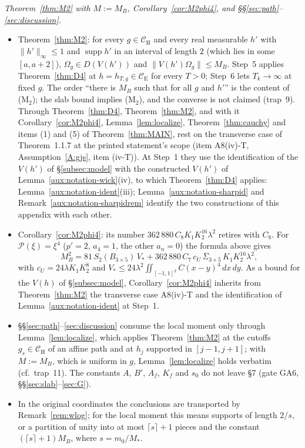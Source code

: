 \documentclass[11pt,a4paper]{article}
\theoremstyle{plain}
\theoremstyle{definition}
\theoremstyle{plain}
\theoremstyle{definition}
\newcommand{\CE}{\mathcal{C}_{\mathrm E}}
\newcommand{\CH}{\mathcal{C}_{\mathrm H}}
\newcommand{\Om}{\Omega}
\DeclareMathOperator{\supp}{supp}
\begin{document}
\emph{Theorem~\ref{thm:M2} with $M:=M_B$, Corollary~\ref{cor:M2phi4}, and \S\S\ref{sec:path}--\ref{sec:discussion}.}
\begin{itemize}
\item Theorem~\ref{thm:M2}: for every $g\in\CH$ and every real measurable $h'$ with
$\|h'\|_\infty\le1$ and $\supp h'$ in an interval of length $2$ (which lies in some
$[a,a+2]$), $\Om_g\in D(V(h'))$ and $\|V(h')\Om_g\|\le M_B$. Step~5 applies
Theorem~\ref{thm:D4} at $h=h_{T,g}\in\CE$ for every $T>0$; Step~6 lets $T_k\to\infty$ at fixed
$g$. The order ``there is $M_B$ such that for all $g$ and $h'$'' is the content of (M$_2$); the
slab bound implies (M$_2$), and the converse is not claimed (trap~9).  Through
Theorem~\ref{thm:D4}, Theorem~\ref{thm:M2}, and with it Corollary~\ref{cor:M2phi4}, Lemma~\ref{lem:localize}, Theorem~\ref{thm:cauchy} and
items (1) and (5) of Theorem~\ref{thm:MAIN}, rest on the transverse case of Theorem~1.1.7 at the printed
statement's scope (item A8(iv)-T, Assumption~\ref{A:gjs}, item (iv-T)).  At Step~1 they use the identification of the $V(h')$ of \S\ref{subsec:model} with the
constructed $V(h')$ of Lemma~\ref{aux:notation-wick}(iv), to which Theorem~\ref{thm:D4} applies:
Lemma~\ref{aux:notation-ident}(iii); Lemma~\ref{aux:notation-sharpid} and
Remark~\ref{aux:notation-sharpidrem} identify the two constructions of this appendix with each
other.
\item Corollary~\ref{cor:M2phi4}: its number $362\,880\,C_8K_1K_2^{16}\lambda^2$ retires
with $C_8$. For $\mathscr P(\xi)=\xi^4$ ($p'=2$, $a_4=1$, the other $a_n=0$) the formula above
gives
\[
 M_B^2=81\,S_2(B_{3\times5})\,V_*+362\,880\,C_7\,c_U\,\overline\Sigma_{3\times5}\,
 K_1K_2^{16}\lambda^2,
\]
with $c_U=24\lambda K_1K_2^8$ and $V_*\le24\lambda^2\iint_{[-1,1]^2}C(x-y)^4\,dx\,dy$.  As a
bound for the $V(h)$ of \S\ref{subsec:model}, Corollary~\ref{cor:M2phi4} inherits from
Theorem~\ref{thm:M2} the transverse case A8(iv)-T and the identification of
Lemma~\ref{aux:notation-ident} at Step~1.
\item \S\S\ref{sec:path}--\ref{sec:discussion} consume the local moment only through Lemma~\ref{lem:localize}, which applies
Theorem~\ref{thm:M2} at the cutoffs $g_s\in\CH$ of an affine path and at $h_j$ supported in
$[j-1,j+1]$; with $M:=M_B$, which is uniform in $g$, Lemma~\ref{lem:localize} holds verbatim (cf.\ trap~11).
The constants $A$, $B'$, $A_f$, $K_f$ and $s_0$ do not leave \S7 (gate GA6,
\S\S\ref{sec:slab}--\ref{sec:G}).
\item In the original coordinates the conclusions are transported by Remark~\ref{rem:wlog}; for the local moment this means supports of length $2/s$, or a partition of unity into
at most $\lceil s\rceil+1$ pieces and the constant $(\lceil s\rceil+1)M_B$, where
$s=m_0/M_*$.
\end{itemize}
\end{document}
